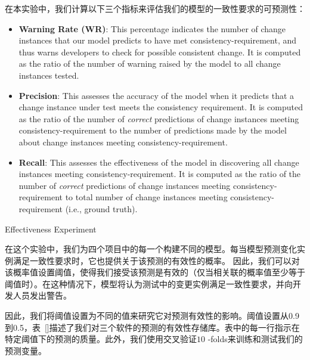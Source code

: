在本实验中，我们计算以下三个指标来评估我们的模型的一致性要求的可预测性：
\begin{itemize}
\item \textbf{Warning Rate (WR)}: 
This percentage indicates the number of change instances that our model predicts to have met consistency-requirement, and thus warns developers to check for possible consistent change.
It is computed as the ratio of the number of warning raised by the model to all change instances tested. 

\item \textbf{Precision}: 
This assesses the accuracy of the model when it predicts that a change instance under test meets the consistency requirement. 
It is computed as the ratio of the number of {\em correct} predictions of change instances meeting consistency-requirement to the number of predictions made by the model about change instances meeting consistency-requirement.

\item \textbf{Recall}: 
This assesses the effectiveness of the model in discovering all change instances meeting consistency-requirement.
It is computed as the ratio of the number of {\em correct} predictions of change instances meeting consistency-requirement to total number of change instances meeting consistency-requirement (i.e., ground truth).
\end{itemize}

{Effectiveness Experiment}

在这个实验中，我们为四个项目中的每一个构建不同的模型。每当模型预测变化实例满足一致性要求时，它也提供关于该预测的有效性的概率。 因此，我们可以对该概率值设置阈值，使得我们接受该预测是有效的（仅当相关联的概率值至少等于阈值时）。在这种情况下，模型将认为测试中的变更实例满足一致性要求，并向开发人员发出警告。

因此，我们将阈值设置为不同的值来研究它对预测有效性的影响。阈值设置从0.9到0.5，表~\ref{}描述了我们对三个软件的预测的有效性存储库。表中的每一行指示在特定阈值下的预测的质量。此外，我们使用交叉验证$ 10 $ -folds来训练和测试我们的预测变量。

